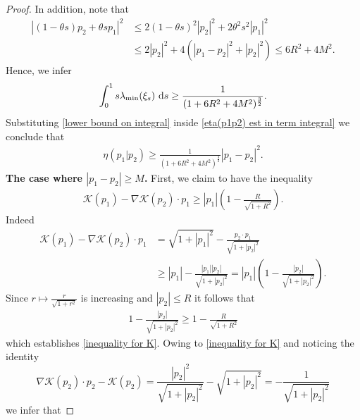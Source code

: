 \documentclass[11pt,reqno]{amsart}
\numberwithin{equation}{section}
\def\dd{{\rm d}}
\begin{document}
\begin{proof}
In addition, note that  
\begin{align*}
\left\vert (1-\theta s)p_{2}+\theta sp_{1}\right\vert^{2}&\leq 2(1-\theta s)^{2}\left\vert p_{2}\right\vert^{2}+2\theta^{2}s^{2} \left\vert p_{1}\right\vert^{2}\\
&\leq 2\left\vert p_{2}\right\vert^{2}+4(\left\vert p_{1}-p_{2}\right\vert^{2}+\left\vert p_{2}\right\vert^{2} 
)\leq 6R^{2}+4M^{2}.     \end{align*}
Hence, we infer  
\begin{align}
\int_{0}^{1} s\lambda_{\min}(\xi_{s})\ \dd s\geq \frac{1}{(1+6R^{2}+4M^{2})^{\frac{3}{2}}}. \label{lower bound on integral}    
\end{align}
Substituting \eqref{lower bound on integral} inside \eqref{eta(p1p2) est in term integral} we conclude that 
\begin{align}
\eta(p_{1}\vert p_{2})\geq \frac{1}{(1+6R^{2}+4M^{2})^{\frac{3}{2}}}\left\vert p_{1}-p_{2}\right\vert^{2}. \label{quadratic est on eta}   
\end{align}
\textbf{The case where $\left\vert p_{1}-p_{2}\right\vert\geq M $.} First, we claim to have the inequality 
\begin{align}
\mathscr{K}(p_{1})-\nabla \mathscr{K}(p_{2})\cdot p_{1}\geq \left\vert p_{1}\right\vert\left(1-\frac{R}{\sqrt{1+R^{2}}}\right).\label{inequality for K}     
\end{align}
Indeed 
\begin{align*}
\mathscr{K}(p_{1})-\nabla \mathscr{K}(p_{2})\cdot p_{1}&=\sqrt{1+\left\vert p_{1}\right\vert^{2}}-\frac{p_{2}\cdot p_{1}}{\sqrt{1+\left\vert p_{2}\right\vert^{2}  }}\\
&\geq \left\vert p_{1}\right\vert-\frac{\left\vert p_{1}\right\vert\left\vert p_{2}\right\vert  }{\sqrt{1+\left\vert p_{2}\right\vert^{2}}}=\left\vert p_{1}\right\vert\left(1-\frac{\left\vert p_{2}\right\vert}{\sqrt{1+\left\vert p_{2}\right\vert^{2} }}\right).       
\end{align*}
Since $r\mapsto \frac{r}{\sqrt{1+r^{2}}}$ is increasing and $\left\vert p_{2}\right\vert\leq R$ it follows that 
\begin{align*}
1-\frac{\left\vert p_{2}\right\vert}{\sqrt{1+\left\vert p_{2}\right\vert^{2}}}\geq 1-\frac{R}{\sqrt{1+R^{2}}}    
\end{align*}
which establishes \eqref{inequality for K}. 
Owing to \eqref{inequality for K} and noticing the identity 
$$\nabla \mathscr{K}(p_{2})\cdot p_{2}-\mathscr{K}(p_{2})=\frac{\left\vert p_{2}\right\vert^{2} }{\sqrt{1+\left\vert p_{2}\right\vert^{2} }}-\sqrt{1+\left\vert p_{2} \right\vert^{2} }=-\frac{1}{\sqrt{1+\left\vert p_{2}\right\vert^{2}}}$$we infer that 

\end{proof}
\end{document}
